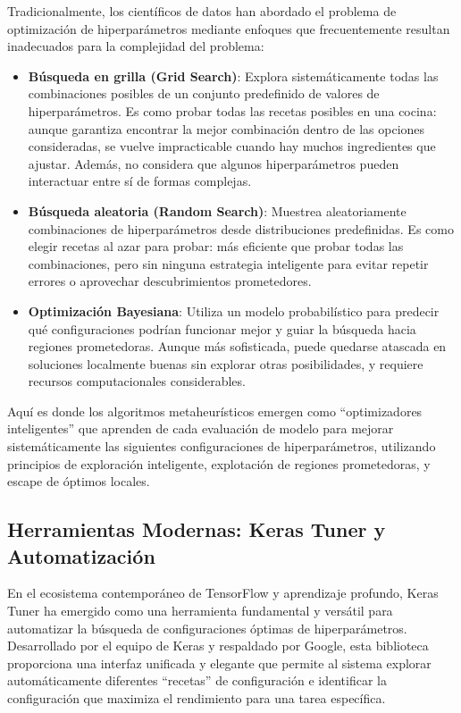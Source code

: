 Tradicionalmente, los científicos de datos han abordado el problema de optimización de hiperparámetros mediante enfoques que frecuentemente resultan inadecuados para la complejidad del problema:

\begin{itemize}
    \item \textbf{Búsqueda en grilla (Grid Search)}: Explora sistemáticamente todas las combinaciones posibles de un conjunto predefinido de valores de hiperparámetros. Es como probar todas las recetas posibles en una cocina: aunque garantiza encontrar la mejor combinación dentro de las opciones consideradas, se vuelve impracticable cuando hay muchos ingredientes que ajustar. Además, no considera que algunos hiperparámetros pueden interactuar entre sí de formas complejas.
    \item \textbf{Búsqueda aleatoria (Random Search)}: Muestrea aleatoriamente combinaciones de hiperparámetros desde distribuciones predefinidas. Es como elegir recetas al azar para probar: más eficiente que probar todas las combinaciones, pero sin ninguna estrategia inteligente para evitar repetir errores o aprovechar descubrimientos prometedores.
    \item \textbf{Optimización Bayesiana}: Utiliza un modelo probabilístico para predecir qué configuraciones podrían funcionar mejor y guiar la búsqueda hacia regiones prometedoras. Aunque más sofisticada, puede quedarse atascada en soluciones localmente buenas sin explorar otras posibilidades, y requiere recursos computacionales considerables.
\end{itemize}

Aquí es donde los algoritmos metaheurísticos emergen como ``optimizadores inteligentes'' que aprenden de cada evaluación de modelo para mejorar sistemáticamente las siguientes configuraciones de hiperparámetros, utilizando principios de exploración inteligente, explotación de regiones prometedoras, y escape de óptimos locales.

\subsection{Herramientas Modernas: Keras Tuner y Automatización}

En el ecosistema contemporáneo de TensorFlow y aprendizaje profundo, Keras Tuner \cite{omalley2020hyperparameter} ha emergido como una herramienta fundamental y versátil para automatizar la búsqueda de configuraciones óptimas de hiperparámetros. Desarrollado por el equipo de Keras y respaldado por Google, esta biblioteca proporciona una interfaz unificada y elegante que permite al sistema explorar automáticamente diferentes ``recetas'' de configuración e identificar la configuración que maximiza el rendimiento para una tarea específica.

